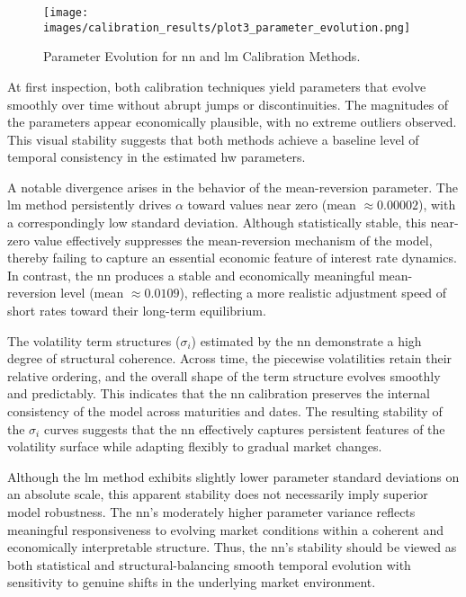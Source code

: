 \begin{figure}[H]
	\centering
	\texttt{[image: images/calibration\_results/plot3\_parameter\_evolution.png]}
	\caption{Parameter Evolution for \ac{nn} and \ac{lm} Calibration Methods.}
	\label{fig:parameter_evolution}
\end{figure}

At first inspection, both calibration techniques yield parameters that evolve smoothly over time without abrupt jumps or discontinuities. The magnitudes of the parameters appear economically plausible, with no extreme outliers observed. This visual stability suggests that both methods achieve a baseline level of temporal consistency in the estimated \ac{hw} parameters.

A notable divergence arises in the behavior of the mean-reversion parameter. The \ac{lm} method persistently drives \(\alpha\) toward values near zero (mean \(\approx 0.00002\)), with a correspondingly low standard deviation. Although statistically stable, this near-zero value effectively suppresses the mean-reversion mechanism of the model, thereby failing to capture an essential economic feature of interest rate dynamics. In contrast, the \ac{nn} produces a stable and economically meaningful mean-reversion level (mean \(\approx 0.0109\)), reflecting a more realistic adjustment speed of short rates toward their long-term equilibrium.

The volatility term structures (\(\sigma_i\)) estimated by the \ac{nn} demonstrate a high degree of structural coherence. Across time, the piecewise volatilities retain their relative ordering, and the overall shape of the term structure evolves smoothly and predictably. This indicates that the \ac{nn} calibration preserves the internal consistency of the model across maturities and dates. The resulting stability of the \(\sigma_i\) curves suggests that the \ac{nn} effectively captures persistent features of the volatility surface while adapting flexibly to gradual market changes.

Although the \ac{lm} method exhibits slightly lower parameter standard deviations on an absolute scale, this apparent stability does not necessarily imply superior model robustness. The \ac{nn}'s moderately higher parameter variance reflects meaningful responsiveness to evolving market conditions within a coherent and economically interpretable structure. Thus, the \ac{nn}'s stability should be viewed as both statistical and structural-balancing smooth temporal evolution with sensitivity to genuine shifts in the underlying market environment.

